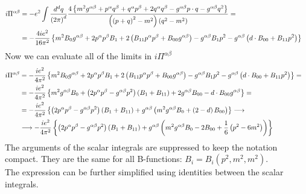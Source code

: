 \begin{align*}
i\Pi^{\alpha\beta} & = -e^2 \int \frac{d^dq}{\left( 2\pi \right)^d} \frac{4\left\lbrace m^2g^{\alpha\beta} + p^{\alpha}q^{\beta} + q^{\alpha}p^{\beta} + 2 q^{\alpha}q^{\beta} - g^{\alpha\beta} p \cdot q - g^{\alpha\beta} q^2 \right\rbrace}{\left( \left( p+q \right)^2 - m^2 \right) \left( q^2 - m^2 \right)} = & \\
& = -\frac{4ie^2}{16\pi^2} \left\lbrace m^2 B_0 g^{\alpha\beta} + 2 p^{\alpha}p^{\beta} B_1 + 2 \left( B_{11} p^{\alpha}p^{\beta} + B_{00} g^{\alpha\beta} \right) - g^{\alpha\beta} B_1 p^2 - g^{\alpha\beta} \left( d \cdot B_{00} + B_{11} p^2 \right) \right\rbrace 
\end{align*}
Now we can evaluate all of the limits in $i\Pi^{\alpha\beta}$
\begin{align*}
i\Pi^{\alpha\beta} & = -\frac{ie^2}{4\pi^2} \left\lbrace m^2 B_0 g^{\alpha\beta} + 2 p^{\alpha}p^{\beta} B_1 + 2 \left( B_{11} p^{\alpha}p^{\beta} + B_{00} g^{\alpha\beta} \right) - g^{\alpha\beta} B_1 p^2 - g^{\alpha\beta} \left( d \cdot B_{00} + B_{11} p^2 \right) \right\rbrace = & \\
& = -\frac{ie^2}{4\pi^2} \left\lbrace m^2 g^{\alpha\beta} B_0 + \left( 2p^{\alpha}p^{\beta} - g^{\alpha\beta} p^2 \right) \left(B_1 + B_{11} \right) + 2g^{\alpha\beta} B_{00} - d \cdot B_{00}g^{\alpha\beta} \right\rbrace = & \\
& = -\frac{ie^2}{4\pi^2} \left\lbrace \left( 2p^{\alpha}p^{\beta} - g^{\alpha\beta} p^2 \right) \left(B_1 + B_{11} \right) + g^{\alpha\beta} \left( m^2 g^{\alpha\beta} B_0 + \left( 2-d  \right) B_{00} \right) \right\rbrace \longrightarrow & \\
& \longrightarrow -\frac{ie^2}{4\pi^2} \left\lbrace \left( 2p^{\alpha}p^{\beta} - g^{\alpha\beta} p^2 \right) \left(B_1 + B_{11} \right) + g^{\alpha\beta} \left( m^2 g^{\alpha\beta} B_0 - 2 B_{00} + \frac{1}{6} \left( p^2 - 6m^2 \right) \right) \right\rbrace  &
\end{align*}
The arguments of the scalar integrals are suppressed to keep the notation compact. They are the same for all B-functions: $B_i = B_i (p^2,m^2,m^2)$. \\
The expression can be further simplified using identities between the scalar integrals.\\

